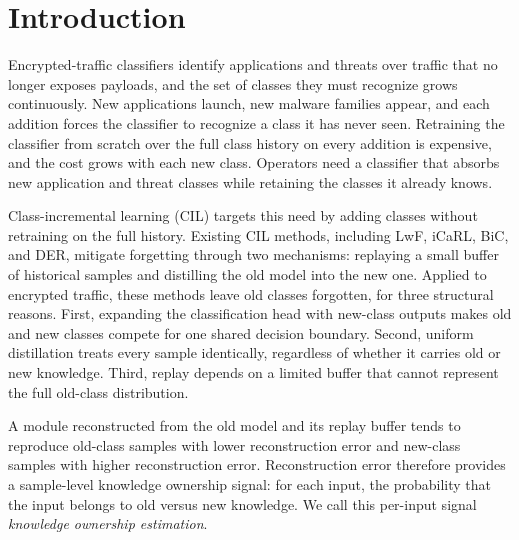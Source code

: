 
\section{Introduction}

Encrypted-traffic classifiers identify applications and threats over traffic that no longer exposes payloads, and the set of classes they must recognize grows continuously.
New applications launch, new malware families appear, and each addition forces the classifier to recognize a class it has never seen.
Retraining the classifier from scratch over the full class history on every addition is expensive, and the cost grows with each new class.
Operators need a classifier that absorbs new application and threat classes while retaining the classes it already knows.

Class-incremental learning (CIL) targets this need by adding classes without retraining on the full history.
Existing CIL methods, including LwF, iCaRL, BiC, and DER, mitigate forgetting through two mechanisms: replaying a small buffer of historical samples and distilling the old model into the new one.
Applied to encrypted traffic, these methods leave old classes forgotten, for three structural reasons.
First, expanding the classification head with new-class outputs makes old and new classes compete for one shared decision boundary.
Second, uniform distillation treats every sample identically, regardless of whether it carries old or new knowledge.
Third, replay depends on a limited buffer that cannot represent the full old-class distribution.

A module reconstructed from the old model and its replay buffer tends to reproduce old-class samples with lower reconstruction error and new-class samples with higher reconstruction error.
Reconstruction error therefore provides a sample-level knowledge ownership signal: for each input, the probability that the input belongs to old versus new knowledge.
We call this per-input signal \emph{knowledge ownership estimation}.

